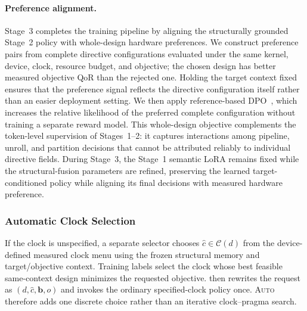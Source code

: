 \paragraph{Preference alignment.}
Stage~3 completes the \framework training pipeline by aligning the structurally grounded Stage~2 policy with whole-design hardware preferences.
We construct preference pairs from complete directive configurations evaluated under the same kernel, device, clock, resource budget, and objective; the
chosen design has better measured objective QoR than the rejected one. Holding the target context fixed ensures that the preference signal reflects the directive configuration itself rather than an easier deployment setting. 
We then apply reference-based DPO~\cite{rafailov2023dpo}, which increases the relative likelihood of the preferred complete configuration without training a separate reward model. This whole-design objective complements the token-level supervision of Stages~1--2: it captures interactions among pipeline, unroll, and partition decisions that cannot be attributed reliably to individual directive fields. During Stage~3, the Stage~1 semantic LoRA remains fixed while the structural-fusion parameters are refined, preserving the learned target-conditioned policy while aligning its final decisions with measured hardware preference.



\subsubsection{Automatic Clock Selection}
\label{subsubsec:auto-clock}

If the clock is unspecified, a separate selector chooses $\hat c\in\mathcal C(d)$ from the device-defined measured clock menu using the frozen structural memory and target/objective context.
Training labels select the clock whose best feasible same-context design minimizes the requested objective. \framework then rewrites the request as $(d,\hat c,\mathbf b,o)$ and invokes the ordinary specified-clock policy once. \textsc{Auto} therefore adds one discrete choice rather than an iterative clock--pragma search.
